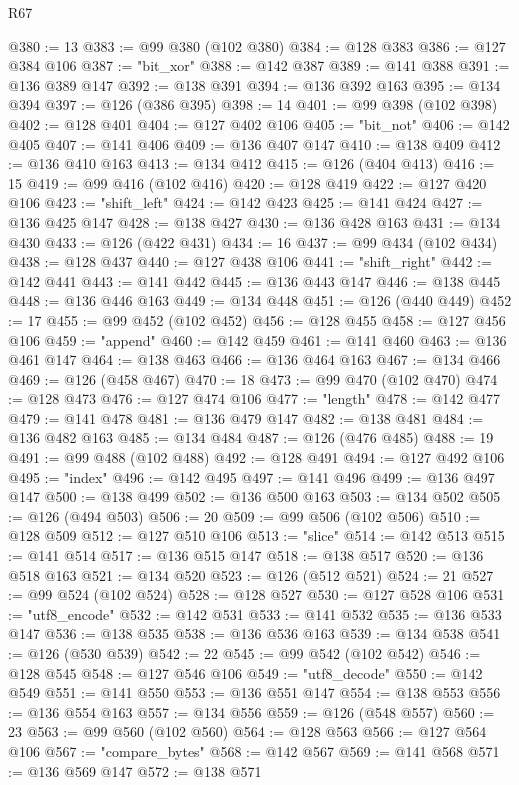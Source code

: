 \begin{lexlean}{R67}
\begin{coremodule}
@380 := 13
@383 := @99 @380 (@102 @380)
@384 := @128 @383
@386 := @127 @384 @106
@387 := "bit_xor"
@388 := @142 @387
@389 := @141 @388
@391 := @136 @389 @147
@392 := @138 @391
@394 := @136 @392 @163
@395 := @134 @394
@397 := @126 (@386 @395)
@398 := 14
@401 := @99 @398 (@102 @398)
@402 := @128 @401
@404 := @127 @402 @106
@405 := "bit_not"
@406 := @142 @405
@407 := @141 @406
@409 := @136 @407 @147
@410 := @138 @409
@412 := @136 @410 @163
@413 := @134 @412
@415 := @126 (@404 @413)
@416 := 15
@419 := @99 @416 (@102 @416)
@420 := @128 @419
@422 := @127 @420 @106
@423 := "shift_left"
@424 := @142 @423
@425 := @141 @424
@427 := @136 @425 @147
@428 := @138 @427
@430 := @136 @428 @163
@431 := @134 @430
@433 := @126 (@422 @431)
@434 := 16
@437 := @99 @434 (@102 @434)
@438 := @128 @437
@440 := @127 @438 @106
@441 := "shift_right"
@442 := @142 @441
@443 := @141 @442
@445 := @136 @443 @147
@446 := @138 @445
@448 := @136 @446 @163
@449 := @134 @448
@451 := @126 (@440 @449)
@452 := 17
@455 := @99 @452 (@102 @452)
@456 := @128 @455
@458 := @127 @456 @106
@459 := "append"
@460 := @142 @459
@461 := @141 @460
@463 := @136 @461 @147
@464 := @138 @463
@466 := @136 @464 @163
@467 := @134 @466
@469 := @126 (@458 @467)
@470 := 18
@473 := @99 @470 (@102 @470)
@474 := @128 @473
@476 := @127 @474 @106
@477 := "length"
@478 := @142 @477
@479 := @141 @478
@481 := @136 @479 @147
@482 := @138 @481
@484 := @136 @482 @163
@485 := @134 @484
@487 := @126 (@476 @485)
@488 := 19
@491 := @99 @488 (@102 @488)
@492 := @128 @491
@494 := @127 @492 @106
@495 := "index"
@496 := @142 @495
@497 := @141 @496
@499 := @136 @497 @147
@500 := @138 @499
@502 := @136 @500 @163
@503 := @134 @502
@505 := @126 (@494 @503)
@506 := 20
@509 := @99 @506 (@102 @506)
@510 := @128 @509
@512 := @127 @510 @106
@513 := "slice"
@514 := @142 @513
@515 := @141 @514
@517 := @136 @515 @147
@518 := @138 @517
@520 := @136 @518 @163
@521 := @134 @520
@523 := @126 (@512 @521)
@524 := 21
@527 := @99 @524 (@102 @524)
@528 := @128 @527
@530 := @127 @528 @106
@531 := "utf8_encode"
@532 := @142 @531
@533 := @141 @532
@535 := @136 @533 @147
@536 := @138 @535
@538 := @136 @536 @163
@539 := @134 @538
@541 := @126 (@530 @539)
@542 := 22
@545 := @99 @542 (@102 @542)
@546 := @128 @545
@548 := @127 @546 @106
@549 := "utf8_decode"
@550 := @142 @549
@551 := @141 @550
@553 := @136 @551 @147
@554 := @138 @553
@556 := @136 @554 @163
@557 := @134 @556
@559 := @126 (@548 @557)
@560 := 23
@563 := @99 @560 (@102 @560)
@564 := @128 @563
@566 := @127 @564 @106
@567 := "compare_bytes"
@568 := @142 @567
@569 := @141 @568
@571 := @136 @569 @147
@572 := @138 @571

\end{coremodule}
\end{lexlean}
